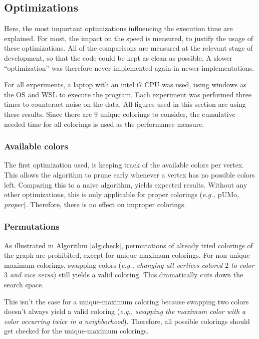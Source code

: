 \documentclass{article}
\begin{document}
\subsection{Optimizations}
\label{sec:optim}

Here, the most important optimizations influencing the execution time are explained. For most, the impact on the speed is measured, to justify the usage of these optimizations. All of the comparisons are measured at the relevant stage of development, so that the code could be kept as clean as possible. A slower ``optimization'' was therefore never implemented again in newer implementations.

For all experiments, a laptop with an intel i7 CPU was used, using windows as the OS and WSL to execute the program. Each experiment was performed three times to counteract noise on the data.
All figures used in this section are using these results. Since there are $9$ unique colorings to consider, the cumulative needed time for all colorings is used as the performance measure.

\subsubsection{Available colors}

The first optimization used, is keeping track of the available colors per vertex. This allows the algorithm to prune early whenever a vertex has no possible colors left. Comparing this to a naive algorithm, yields expected results. Without any other optimizations, this is only applicable for proper colorings (\textit{e.g., $\mathrm{pUMo}$, proper}). Therefore, there is no effect on improper colorings. 

\subsubsection{Permutations}

As illustrated in Algorithm \ref{alg:check}, permutations of already tried colorings of the graph are prohibited, except for unique-maximum colorings. For non-unique-maximum colorings, swapping colors (\textit{e.g., changing all vertices colored $2$ to color $3$ and vice versa}) still yields a valid coloring. This dramatically cuts down the search space. 

This isn't the case for a unique-maximum coloring because swapping two colors doesn't always yield a valid coloring (\textit{e.g., swapping the maximum color with a color occurring twice in a neighborhood}). Therefore, all possible colorings should get checked for the unique-maximum colorings. 
\end{document}
